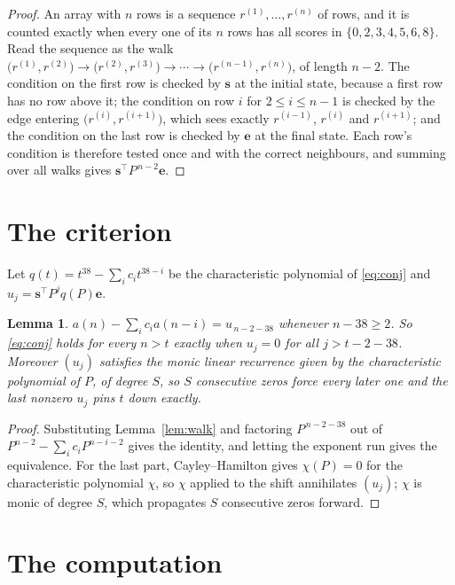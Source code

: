 \documentclass[11pt,a4paper]{article}
\theoremstyle{plain}
\newtheorem{lemma}[theorem]{Lemma}
\theoremstyle{definition}
\begin{document}
\begin{proof}
An array with $n$ rows is a sequence $r^{(1)},\dots,r^{(n)}$ of rows, and it is counted
exactly when every one of its $n$ rows has all scores in $\{0,2,3,4,5,6,8\}$. Read the sequence as the
walk $\bigl(r^{(1)},r^{(2)}\bigr)\to\bigl(r^{(2)},r^{(3)}\bigr)\to\cdots\to
\bigl(r^{(n-1)},r^{(n)}\bigr)$, of length $n-2$. The condition on the first row is
checked by $\mathbf{s}$ at the initial state, because a first row has no row above it; the
condition on row $i$ for $2\le i\le n-1$ is checked by the edge entering
$\bigl(r^{(i)},r^{(i+1)}\bigr)$, which sees exactly $r^{(i-1)}$, $r^{(i)}$ and
$r^{(i+1)}$; and the condition on the last row is checked by $\mathbf{e}$ at the final
state. Each row's condition is therefore tested once and with the correct neighbours, and
summing over all walks gives $\mathbf{s}^{\!\top}P^{\,n-2}\mathbf{e}$.
\end{proof}

\section{The criterion}

Let $q(t)=t^{38}-\sum_i c_i t^{38-i}$ be the characteristic polynomial of
\eqref{eq:conj} and $u_j=\mathbf{s}^{\!\top}P^{j}q(P)\mathbf{e}$.

\begin{lemma}\label{lem:crit}
$a(n)-\sum_i c_i a(n-i)=u_{\,n-2-38}$ whenever $n-38\ge2$. So \eqref{eq:conj}
holds for every $n>t$ exactly when $u_j=0$ for all $j>t-2-38$. Moreover $(u_j)$
satisfies the monic linear recurrence given by the characteristic polynomial of $P$, of
degree $S$, so $S$ consecutive zeros force every later one and the last nonzero $u_j$ pins
$t$ down exactly.
\end{lemma}

\begin{proof}
Substituting Lemma~\ref{lem:walk} and factoring $P^{\,n-2-38}$ out of
$P^{n-2}-\sum_i c_i P^{n-i-2}$ gives the identity, and letting the exponent run gives the
equivalence. For the last part, Cayley--Hamilton gives $\chi(P)=0$ for the characteristic
polynomial $\chi$, so $\chi$ applied to the shift annihilates $(u_j)$; $\chi$ is monic of
degree $S$, which propagates $S$ consecutive zeros forward.
\end{proof}

\section{The computation}
\end{document}
